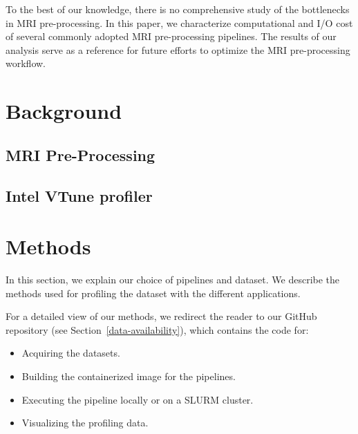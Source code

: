 \documentclass[conference]{IEEEtran}
\begin{document}
To the best of our knowledge, there is no comprehensive study of the bottlenecks in MRI pre-processing. In this paper, we characterize computational and I/O cost of several commonly adopted MRI pre-processing pipelines. The results of our analysis serve as a reference for future efforts to optimize the MRI pre-processing workflow.

\section{Background}

\subsection{MRI Pre-Processing}







\subsection{Intel VTune profiler}





\section{Methods}
In this section, we explain our choice of pipelines and dataset. We describe the methods used for profiling the dataset with the different applications.

For a detailed view of our methods, we redirect the reader to our GitHub repository (see Section~\ref{data-availability}), which contains the code for:

\begin{itemize}
	\item Acquiring the datasets.
	\item Building the containerized image for the pipelines.
	\item Executing the pipeline locally or on a SLURM cluster.
	\item Visualizing the profiling data.
\end{itemize}
\end{document}
